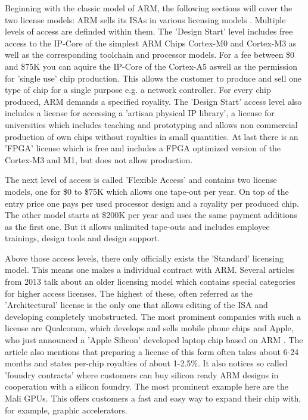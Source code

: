 \documentclass[conference]{IEEEtran}
\begin{document}
	Beginning with the classic model of ARM, the following sections will cover the two license models: ARM sells its \glspl{ISA} in various licensing models \cite{ARMLC}. Multiple levels of access are definded within them. The 'Design Start' level includes free access to the IP-Core of the simplest ARM Chips Cortex-M0 and Cortex-M3 as well as the corresponding toolchain and processor models. For a fee between \$0 and \$75K \cite{ARMLC} you can aquire the IP-Core of the Cortex-A5 aswell as the permission for 'single use' chip production. This allows the customer to produce and sell one type of chip for a single purpose e.g. a network controller. For every chip produced, ARM demands a specified royality. The 'Design Start' access level also includes a license for accessing a 'artisan physical IP library', a license for universities which includes teaching and prototyping and allows non commercial production of own chips without royalties in small quantities. At last there is an '\acrshort{FPGA}' license which is free and includes a \gls{FPGA} optimized version of the Cortex-M3 and M1, but does not allow production.

	The next level of access is called 'Flexible Access' and contains two license models, one for \$0 to \$75K which allows one tape-out per year. On top of the entry price one pays per used processor design and a royality per produced chip. The other model starts at \$200K per year and uses the same payment additions as the first one. But it allows unlimited tape-outs and includes employee trainings, design tools and design support. \cite{ARMLC}

	Above those access levels, there only officially exists the 'Standard' licensing model. This means one makes a individual contract with ARM.
	Several articles from 2013 \cite{Demerjian2013}\cite{Demerjian2013a} talk about an older licensing model which contains special categories for higher access licenses. The highest of these, often referred as the 'Architectural' license is the only one that allows editing of the \gls{ISA} and developing completely unobstructed. The most prominent companies with such a license are Qualcomm, which develops and sells mobile phone chips and Apple, who just announced a 'Apple Silicon' developed laptop chip based on ARM \cite{Apple2020}. The article also mentions that preparing a license of this form often takes about 6-24 months and states per-chip royalties of about 1-2.5\%. It also notices so called 'foundry contracts' where customers can buy silicon ready ARM designs in cooperation with a silicon foundry. The most prominent example here are the Mali GPUs. This offers customers a fast and easy way to expand their chip with, for example, graphic accelerators.
\end{document}
